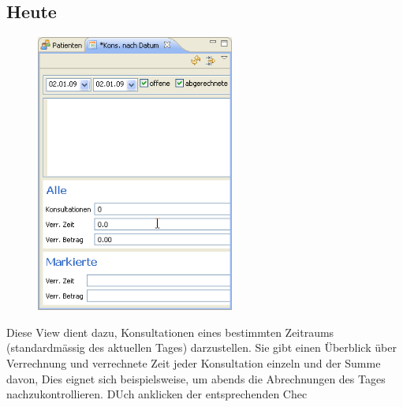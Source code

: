 \subsection{Heute}
\begin{figure}
\includegraphics[width=6.5cm]{images/heute}
\end{figure}
Diese View dient dazu, Konsultationen eines bestimmten Zeitraums (standardmässig
des aktuellen Tages) darzustellen. Sie gibt einen Überblick über Verrechnung und
verrechnete Zeit jeder Konsultation einzeln und der Summe davon, Dies eignet
sich beispielsweise, um abends die Abrechnungen des Tages nachzukontrollieren. DUch anklicken der entsprechenden Chec

